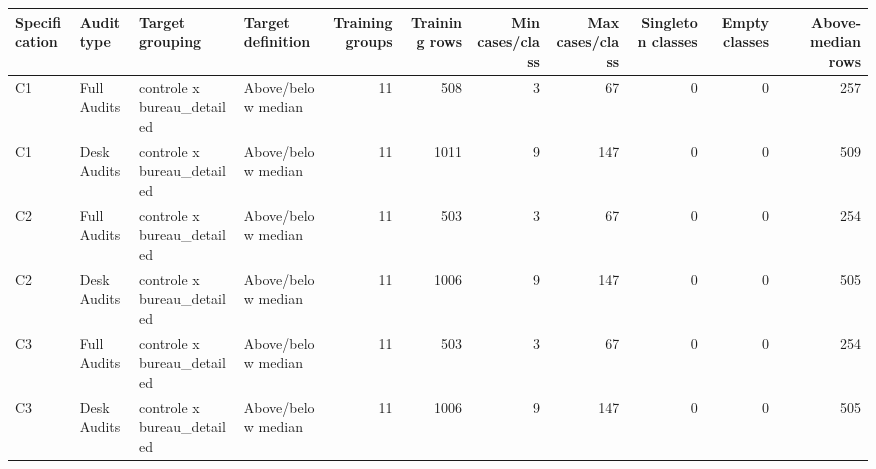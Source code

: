 \begin{tabular}[t]{llllrrrrrrr}
\toprule
Specification & Audit type & Target grouping & Target definition & Training groups & Training rows & Min cases/class & Max cases/class & Singleton classes & Empty classes & Above-median rows\\
\midrule
C1 & Full Audits & controle x bureau\_detailed & Above/below median & 11 & 508 & 3 & 67 & 0 & 0 & 257\\
C1 & Desk Audits & controle x bureau\_detailed & Above/below median & 11 & 1011 & 9 & 147 & 0 & 0 & 509\\
C2 & Full Audits & controle x bureau\_detailed & Above/below median & 11 & 503 & 3 & 67 & 0 & 0 & 254\\
C2 & Desk Audits & controle x bureau\_detailed & Above/below median & 11 & 1006 & 9 & 147 & 0 & 0 & 505\\
C3 & Full Audits & controle x bureau\_detailed & Above/below median & 11 & 503 & 3 & 67 & 0 & 0 & 254\\
C3 & Desk Audits & controle x bureau\_detailed & Above/below median & 11 & 1006 & 9 & 147 & 0 & 0 & 505\\
\bottomrule
\end{tabular}
